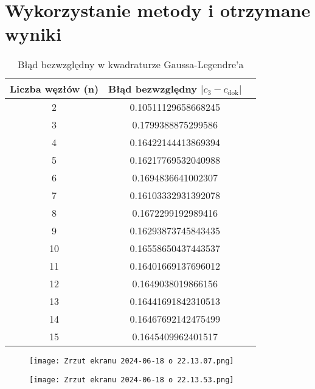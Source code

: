 \documentclass{article}
\begin{document}
\section{Wykorzystanie metody i otrzymane wyniki} 

\begin{table}[h!]
\centering
\begin{tabular}{ccc}
\toprule
Liczba węzłów (n) & Błąd bezwzględny \(|c_3 - c_{\text{dok}}|\) \\
\midrule
2  & 0.10511129658668245  \\
3  & 0.1799388875299586   \\
4  & 0.16422144413869394  \\
5  & 0.16217769532040988  \\
6  & 0.1694836641002307   \\
7  & 0.16103332931392078  \\
8  & 0.1672299192989416   \\
9  & 0.16293873745843435  \\
10 & 0.16558650437443537  \\
11 & 0.16401669137696012  \\
12 & 0.1649038019866156   \\
13 & 0.16441691842310513  \\
14 & 0.16467692142475499  \\
15 & 0.1645409962401517   \\
\bottomrule
\end{tabular}
\caption{Błąd bezwzględny w kwadraturze Gaussa-Legendre'a}
\label{tab:error}
\end{table}

\begin{figure}[H]
    \centering
    \texttt{[image: Zrzut ekranu 2024-06-18 o 22.13.07.png]}
    \caption*{}
    \label{fig:enter-label}
\end{figure}

\begin{figure}[H]
    \centering
    \texttt{[image: Zrzut ekranu 2024-06-18 o 22.13.53.png]}
    \caption*{}
    \label{fig:enter-label}
\end{figure}
\end{document}

